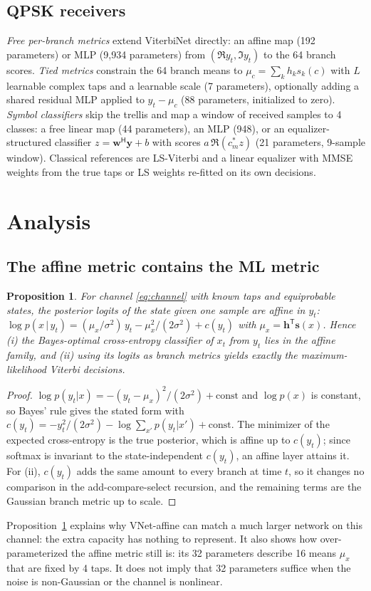 \documentclass[journal]{IEEEtran}
\newtheorem{proposition}{Proposition}
\begin{document}
\subsection{QPSK receivers}
\emph{Free per-branch metrics} extend ViterbiNet directly: an affine map (192 parameters) or MLP (9,934 parameters) from $(\Re y_t,\Im y_t)$ to the 64 branch scores. \emph{Tied metrics} constrain the 64 branch means to $\mu_c=\sum_k h_k s_k(c)$ with $L$ learnable complex taps and a learnable scale (7 parameters), optionally adding a shared residual MLP applied to $y_t-\mu_c$ (88 parameters, initialized to zero). \emph{Symbol classifiers} skip the trellis and map a window of received samples to 4 classes: a free linear map (44 parameters), an MLP (948), or an equalizer-structured classifier $z=\mathbf w^{\mathsf H}\mathbf y+b$ with scores $a\,\Re(c_m^* z)$ (21 parameters, 9-sample window). Classical references are LS-Viterbi and a linear equalizer with MMSE weights from the true taps or LS weights re-fitted on its own decisions.

\section{Analysis}\label{sec:analysis}
\subsection{The affine metric contains the ML metric}
\begin{proposition}\label{prop:affine}
For channel \eqref{eq:channel} with known taps and equiprobable states, the posterior logits of the state given one sample are affine in $y_t$: $\log p(x\,|\,y_t)=(\mu_x/\sigma^2)\,y_t-\mu_x^2/(2\sigma^2)+c(y_t)$ with $\mu_x=\mathbf h^{\mathsf T}\mathbf s(x)$. Hence (i) the Bayes-optimal cross-entropy classifier of $x_t$ from $y_t$ lies in the affine family, and (ii) using its logits as branch metrics yields exactly the maximum-likelihood Viterbi decisions.
\end{proposition}
\begin{proof}
$\log p(y_t|x)=-(y_t-\mu_x)^2/(2\sigma^2)+\text{const}$ and $\log p(x)$ is constant, so Bayes' rule gives the stated form with $c(y_t)=-y_t^2/(2\sigma^2)-\log\sum_{x'}p(y_t|x')+\text{const}$. The minimizer of the expected cross-entropy is the true posterior, which is affine up to $c(y_t)$; since softmax is invariant to the state-independent $c(y_t)$, an affine layer attains it. For (ii), $c(y_t)$ adds the same amount to every branch at time $t$, so it changes no comparison in the add-compare-select recursion, and the remaining terms are the Gaussian branch metric up to scale.
\end{proof}
Proposition~\ref{prop:affine} explains why VNet-affine can match a much larger network on this channel: the extra capacity has nothing to represent. It also shows how over-parameterized the affine metric still is: its 32 parameters describe 16 means $\mu_x$ that are fixed by 4 taps. It does not imply that 32 parameters suffice when the noise is non-Gaussian or the channel is nonlinear.
\end{document}
